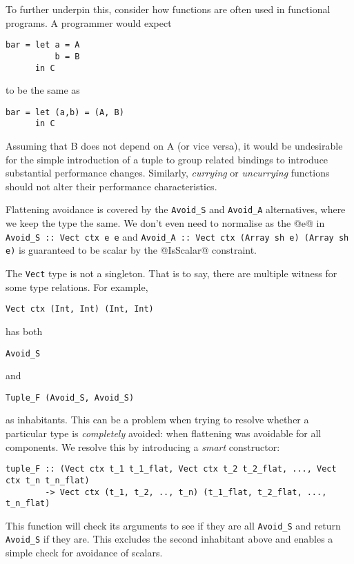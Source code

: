 To further underpin this, consider how functions are often used in functional programs. A programmer would expect
%
\begin{lstlisting}[style=ndp]
bar = let a = A
          b = B
      in C
\end{lstlisting}
%
to be the same as
%
\begin{lstlisting}[style=ndp]
bar = let (a,b) = (A, B)
      in C
\end{lstlisting}
%
Assuming that B does not depend on A (or vice versa), it would be undesirable for the simple introduction of a tuple to group related bindings to introduce substantial performance changes. Similarly, \emph{currying} or \emph{uncurrying} functions should not alter their performance characteristics.

Flattening avoidance is covered by the \lstinline[style=ndp]{Avoid_S} and \lstinline[style=ndp]{Avoid_A} alternatives, where we keep the type the same. We don't even need to normalise as the @e@ in \lstinline[style=ndp]{Avoid_S :: Vect ctx e e} and \lstinline[style=ndp]{Avoid_A :: Vect ctx (Array sh e) (Array sh e)} is guaranteed to be scalar by the @IsScalar@ constraint.

The \lstinline[style=ndp]{Vect} type is not a singleton. That is to say, there are multiple witness for some type relations. For example,
%
\begin{lstlisting}[style=ndp]
Vect ctx (Int, Int) (Int, Int)
\end{lstlisting}
%
has both
%
\begin{lstlisting}[style=ndp]
Avoid_S
\end{lstlisting}
%
and
%
\begin{lstlisting}[style=ndp]
Tuple_F (Avoid_S, Avoid_S)
\end{lstlisting}
%
as inhabitants. This can be a problem when trying to resolve whether a particular type is \emph{completely} avoided: when flattening was avoidable for all components. We resolve this by introducing a \emph{smart} constructor:
%
\begin{lstlisting}[style=ndp]
tuple_F :: (Vect ctx t_1 t_1_flat, Vect ctx t_2 t_2_flat, ..., Vect ctx t_n t_n_flat)
        -> Vect ctx (t_1, t_2, .., t_n) (t_1_flat, t_2_flat, ..., t_n_flat)
\end{lstlisting}

This function will check its arguments to see if they are all \lstinline[style=ndp]{Avoid_S} and return \lstinline[style=ndp]{Avoid_S} if they are. This excludes the second inhabitant above and enables a simple check for avoidance of scalars.

